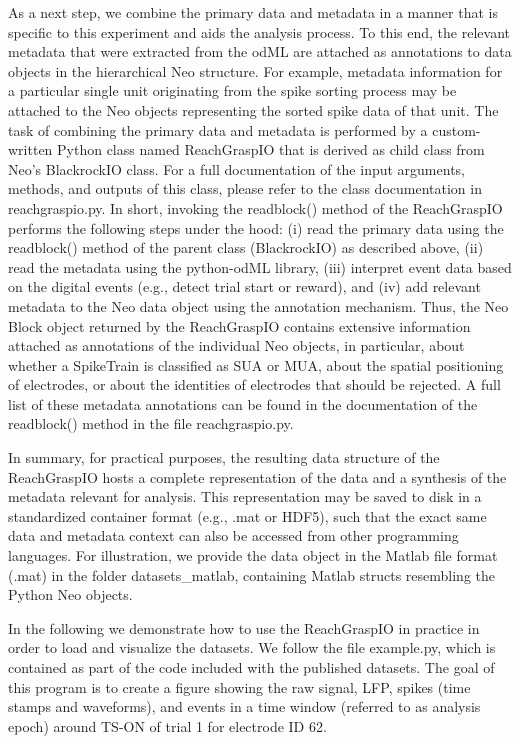 As a next step, we combine the primary data and metadata in a manner that is specific to this experiment and aids the analysis process. To this end, the relevant metadata that were extracted from the odML are attached as annotations to data objects in the hierarchical Neo structure. For example, metadata information for a particular single unit originating from the spike sorting process may be attached to the Neo objects representing the sorted spike data of that unit. The task of combining the primary data and metadata is performed by a custom-written Python class named ReachGraspIO that is derived as child class from Neo's BlackrockIO class. For a full documentation of the input arguments, methods, and outputs of this class, please refer to the class documentation in reachgraspio.py. In short, invoking the readblock() method of the ReachGraspIO performs the following steps under the hood: (i) read the primary data using the readblock() method of the parent class (BlackrockIO) as described above, (ii) read the metadata using the python-odML library, (iii) interpret event data based on the digital events (e.g., detect trial start or reward), and (iv) add relevant metadata to the Neo data object using the annotation mechanism. Thus, the Neo Block object returned by the ReachGraspIO contains extensive information attached as annotations of the individual Neo objects, in particular, about whether a SpikeTrain is classified as SUA or MUA, about the spatial positioning of electrodes, or about the identities of electrodes that should be rejected. A full list of these metadata annotations can be found in the documentation of the readblock() method in the file reachgraspio.py.

In summary, for practical purposes, the resulting data structure of the ReachGraspIO hosts a complete representation of the data and a synthesis of the metadata relevant for analysis. This representation may be saved to disk in a standardized container format (e.g., .mat or HDF5), such that the exact same data and metadata context can also be accessed from other programming languages. For illustration, we provide the data object in the Matlab file format (.mat) in the folder datasets\_matlab, containing Matlab structs resembling the Python Neo objects.

In the following we demonstrate how to use the ReachGraspIO in practice in order to load and visualize the datasets. We follow the file example.py, which is contained as part of the code included with the published datasets. The goal of this program is to create a figure showing the raw signal, LFP, spikes (time stamps and waveforms), and events in a time window (referred to as analysis epoch) around TS-ON of trial 1 for electrode ID 62. 

